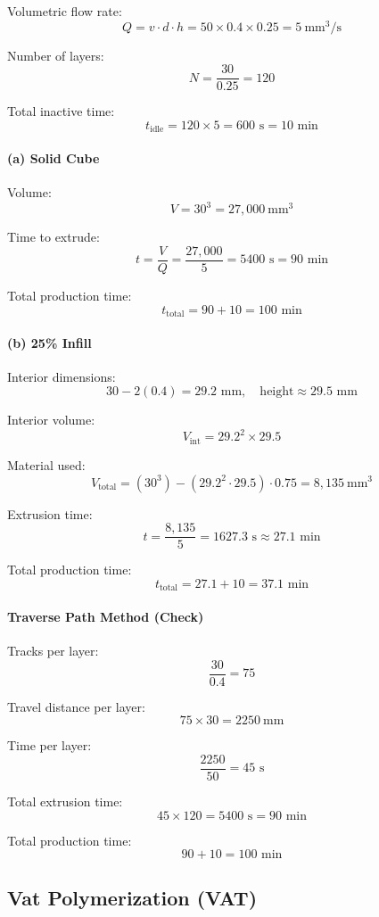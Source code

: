 \documentclass{article}
\begin{document}
Volumetric flow rate:
\[
Q = v \cdot d \cdot h
= 50 \times 0.4 \times 0.25
= \boxed{5\ \text{mm}^3/\text{s}}
\]

Number of layers:
\[
N = \frac{30}{0.25} = 120
\]

Total inactive time:
\[
t_{\text{idle}} = 120 \times 5 = 600 \text{ s} = 10 \text{ min}
\]

\paragraph{(a) Solid Cube}

Volume:
\[
V = 30^3 = 27{,}000 \ \text{mm}^3
\]

Time to extrude:
\[
t = \frac{V}{Q} = \frac{27{,}000}{5} = 5400 \text{ s} = 90 \text{ min}
\]

Total production time:
\[
t_{\text{total}} = 90 + 10 = \boxed{100 \text{ min}}
\]

\paragraph{(b) 25\% Infill}

Interior dimensions:
\[
30 - 2(0.4) = 29.2 \text{ mm}, \quad \text{height} \approx 29.5 \text{ mm}
\]

Interior volume:
\[
V_{\text{int}} = 29.2^2 \times 29.5
\]

Material used:
\[
V_{\text{total}} = (30^3) - (29.2^2 \cdot 29.5)\cdot 0.75 = 8{,}135 \ \text{mm}^3
\]

Extrusion time:
\[
t = \frac{8{,}135}{5} = 1627.3 \text{ s} \approx 27.1 \text{ min}
\]

Total production time:
\[
t_{\text{total}} = 27.1 + 10 = \boxed{37.1 \text{ min}}
\]

\paragraph{Traverse Path Method (Check)}

Tracks per layer:
\[
\frac{30}{0.4} = 75
\]

Travel distance per layer:
\[
75 \times 30 = 2250 \ \text{mm}
\]

Time per layer:
\[
\frac{2250}{50} = 45 \text{ s}
\]

Total extrusion time:
\[
45 \times 120 = 5400 \text{ s} = 90 \text{ min}
\]

Total production time:
\[
90 + 10 = 100 \text{ min}
\]

\subsection{Vat Polymerization (VAT)}
\end{document}
